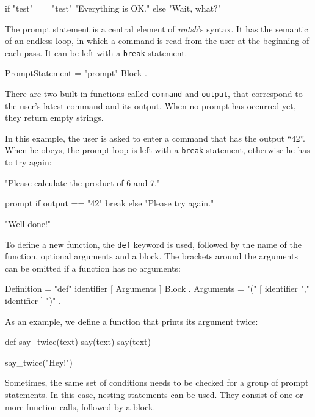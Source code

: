 \documentclass[paper=a4,twoside,abstract=on,cleardoublepage=empty,numbers=noenddot,toc=bib,toc=listof,12pt,appendixprefix=true]{scrreprt}
\begin{document}
\begin{nutsh}
if "test" == "test" {
    "Everything is OK."
} else {
    "Wait, what?"
}
\end{nutsh}


The prompt statement is a central element of \emph{nutsh}'s syntax. It has the semantic of an endless loop, in which a command is read from the user at the beginning of each pass. It can be left with a \texttt{break} statement.

\begin{ebnf}
PromptStatement = "prompt" Block .
\end{ebnf}
%
There are two built-in functions called \texttt{command} and \texttt{output}, that correspond to the user's latest command and its output. When no prompt has occurred yet, they return empty strings.

In this example, the user is asked to enter a command that has the output “42”. When he obeys, the prompt loop is left with a \texttt{break} statement, otherwise he has to try again:

\begin{nutsh}
"Please calculate the product of 6 and 7."

prompt {
    if output == "42" {
        break
    } else {
        "Please try again."
    }
}

"Well done!"
\end{nutsh}


To define a new function, the \texttt{def} keyword is used, followed by the name of the function, optional arguments and a block. The brackets around the arguments can be omitted if a function has no arguments:

\begin{ebnf}
Definition = "def" identifier [ Arguments ] Block .
Arguments = "(" [ identifier { "," identifier } ] ")" .
\end{ebnf}
%
As an example, we define a function that prints its argument twice:

\begin{nutsh}
def say_twice(text) {
    say(text)
    say(text)
}

say_twice("Hey!")
\end{nutsh}


Sometimes, the same set of conditions needs to be checked for a group of prompt statements. In this case, nesting statements can be used. They consist of one or more function calls, followed by a block.
\end{document}
